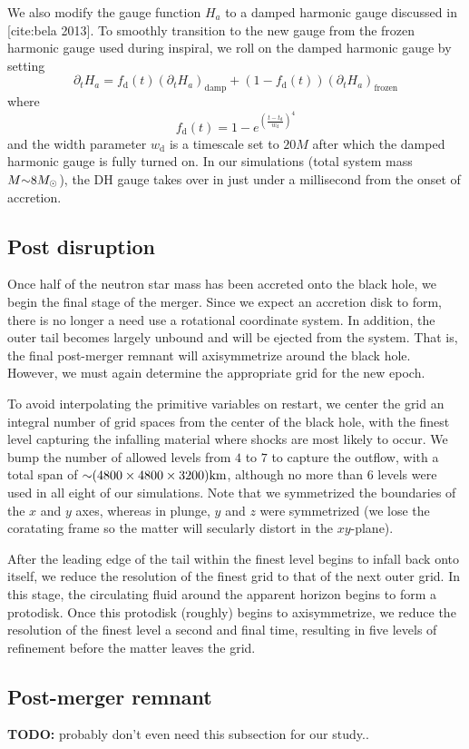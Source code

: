 We also modify the gauge function $H_a$ to a damped harmonic gauge discussed in [cite:bela 2013].  To smoothly transition to the new gauge from the frozen harmonic gauge used during inspiral, we roll on the damped harmonic gauge by setting
\begin{equation}
\partial_t H_a = f_\textrm{d}(t) (\partial_t H_a)_\textrm{damp} + (1 - f_\textrm{d}(t)) (\partial_t H_a)_\textrm{frozen}
\end{equation}
where 
\begin{equation}
f_\textrm{d}(t) = 1 - e^{ \left(\frac{t-t_\textrm{d}}{w_\textrm{d}} \right)^4 }
\end{equation}
and the width parameter $w_\textrm{d}$ is a timescale set to $20 M$ after which the damped harmonic gauge is fully turned on.  In our simulations (total system mass $M \mathord{\sim} 8 M_\odot$), the DH gauge takes over in just under a millisecond from the onset of accretion.


\subsection{Post disruption}

Once half of the neutron star mass has been accreted onto the black hole, we begin the final stage of the merger.  Since we expect an accretion disk to form, there is no longer a need use a rotational coordinate system.
In addition, the outer tail becomes largely unbound and will be ejected from the system.  
That is, the final post-merger remnant will axisymmetrize around the black hole.
However, we must again determine the appropriate grid for the new epoch.

To avoid interpolating the primitive variables on restart, we center the grid an integral number of grid spaces from the center of the black hole, with the finest level capturing the infalling material where shocks are most likely to occur.  
We bump the number of allowed levels from $4$ to $7$ to capture the outflow, with a total span of $\mathord{\sim}(4800 \times 4800 \times 3200) \textrm{km}$, although no more than $6$ levels were used in all eight of our simulations.
Note that we symmetrized the boundaries of the $x$ and $y$ axes, whereas in plunge, $y$ and $z$ were symmetrized (we lose the coratating frame so the matter will secularly distort in the $xy$-plane).    

After the leading edge of the tail within the finest level begins to infall back onto itself, we reduce the resolution of the finest grid to that of the next outer grid. 
In this stage, the circulating fluid around the apparent horizon begins to form a protodisk.
Once this protodisk (roughly) begins to axisymmetrize, we reduce the resolution of the finest level a second and final time, resulting in five levels of refinement before the matter leaves the grid.

\subsection{Post-merger remnant}

\textbf{TODO:} probably don't even need this subsection for our study..










